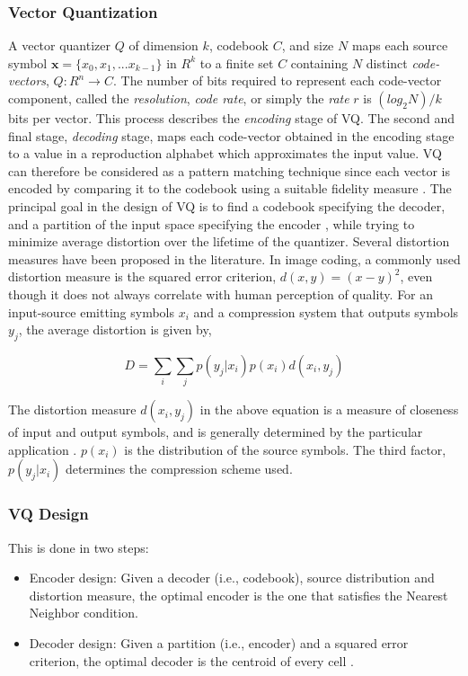 \documentclass[12pt,letterpaper,doublespaced,ETD,proposal]{gt-ece-thesis}
\begin{document}
\begin{Body}
\subsubsection{Vector Quantization}
A vector quantizer $Q$ of dimension $k$, codebook $C$, and size $N$ maps each source symbol $\mathbf{x}=\{{x_0, x_1, ... x_{k-1}\}}$ in $R^k$ to a finite set $C$ containing $N$ distinct \emph{code-vectors}, $Q:R^n \rightarrow C$.  The number of bits required to represent each code-vector component, called the \emph{resolution}, \emph{code rate}, or simply the \emph{rate} $r$ is $(log_2N)/k$ bits per vector.  This process describes the \emph{encoding} stage of VQ.  The second and final stage, \emph{decoding} stage, maps each code-vector obtained in the encoding stage to a value in a reproduction alphabet which approximates the input value.  VQ can therefore be considered as a pattern matching technique since each vector is encoded by comparing it to the codebook using a suitable fidelity measure \cite{1983_JNL_VQ_Gersho}.  The principal goal in the design of VQ is to find a codebook specifying the decoder, and a partition of the input space specifying the encoder \cite{1991_BOOK_VQ_GershoGray}, while trying to minimize average distortion over the lifetime of the quantizer.  Several distortion measures have been proposed in the literature.  In image coding, a commonly used distortion measure is the squared error criterion, $d(x,y)=(x-y)^2$, even though it does not always correlate with human perception of quality.  For an input-source emitting symbols $x_i$ and a compression system that outputs symbols $y_j$, the average distortion is given by,

\begin{equation}
D =\sum_i \sum_j p(y_j|x_i)p(x_i)d(x_i, y_j) 
\end{equation}

The distortion measure $d(x_i, y_j)$ in the above equation is a measure of closeness of input and output symbols, and is generally determined by the particular application \cite{2005_BOOK_DataCompression_Sayood}.  $p(x_i)$ is the distribution of the source symbols.  The third factor, $p(y_j|x_i)$ determines the compression scheme used.  

\subsubsection{VQ Design}
This is done in two steps: 

\begin{itemize}
\item Encoder design: Given a decoder (i.e., codebook), source distribution and distortion measure, the optimal encoder is the one that satisfies the Nearest Neighbor condition.
\item Decoder design: Given a partition (i.e., encoder) and a squared error criterion, the optimal decoder is the centroid of every cell \cite{1991_BOOK_VQ_GershoGray}.  
\end{itemize}


\end{Body}
\end{document}
